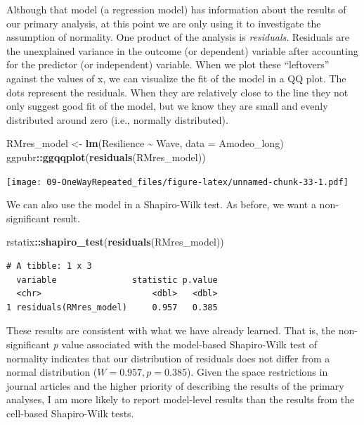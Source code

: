 \documentclass[
  11pt,
]{book}
\newenvironment{Shaded}{\begin{snugshade}}{\end{snugshade}}
\newcommand{\AttributeTok}[1]{\textcolor[rgb]{0.27,0.27,0.27}{#1}}
\newcommand{\FunctionTok}[1]{\textcolor[rgb]{0.27,0.27,0.27}{\textbf{#1}}}
\newcommand{\NormalTok}[1]{#1}
\newcommand{\OtherTok}[1]{\textcolor[rgb]{0.37,0.37,0.37}{#1}}
\newcommand{\SpecialCharTok}[1]{\textcolor[rgb]{0.43,0.43,0.43}{\textbf{#1}}}
\begin{document}
Although that model (a regression model) has information about the results of our primary analysis, at this point we are only using it to investigate the assumption of normality. One product of the analysis is \emph{residuals}. Residuals are the unexplained variance in the outcome (or dependent) variable after accounting for the predictor (or independent) variable. When we plot these ``leftovers'' against the values of x, we can visualize the fit of the model in a QQ plot. The dots represent the residuals. When they are relatively close to the line they not only suggest good fit of the model, but we know they are small and evenly distributed around zero (i.e., normally distributed).

\begin{Shaded}
\begin{Highlighting}[]
\NormalTok{RMres\_model }\OtherTok{\textless{}{-}} \FunctionTok{lm}\NormalTok{(Resilience }\SpecialCharTok{\textasciitilde{}}\NormalTok{ Wave, }\AttributeTok{data =}\NormalTok{ Amodeo\_long)}
\NormalTok{ggpubr}\SpecialCharTok{::}\FunctionTok{ggqqplot}\NormalTok{(}\FunctionTok{residuals}\NormalTok{(RMres\_model))}
\end{Highlighting}
\end{Shaded}

\texttt{[image: 09-OneWayRepeated\_files/figure-latex/unnamed-chunk-33-1.pdf]}

We can also use the model in a Shapiro-Wilk test. As before, we want a non-significant result.

\begin{Shaded}
\begin{Highlighting}[]
\NormalTok{rstatix}\SpecialCharTok{::}\FunctionTok{shapiro\_test}\NormalTok{(}\FunctionTok{residuals}\NormalTok{(RMres\_model))}
\end{Highlighting}
\end{Shaded}

\begin{verbatim}
# A tibble: 1 x 3
  variable               statistic p.value
  <chr>                      <dbl>   <dbl>
1 residuals(RMres_model)     0.957   0.385
\end{verbatim}

These results are consistent with what we have already learned. That is, the non-significant \emph{p} value associated with the model-based Shapiro-Wilk test of normality indicates that our distribution of residuals does not differ from a normal distribution (\(W = 0.957, p = 0.385\)). Given the space restrictions in journal articles and the higher priority of describing the results of the primary analyses, I am more likely to report model-level results than the results from the cell-based Shapiro-Wilk tests.
\end{document}
